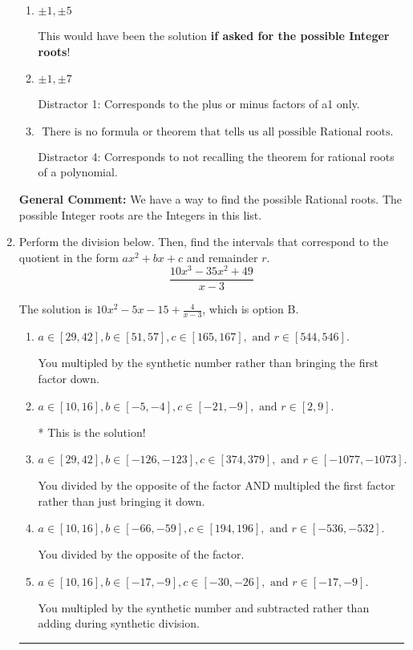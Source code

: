 \documentclass{extbook}[14pt]
\newcommand{\litem}[1]{\item #1

\rule{\textwidth}{0.4pt}}
\begin{document}
\begin{enumerate}
{\begin{enumerate}[label=\Alph*.]
 Distractor 3: Corresponds to the plus or minus of the inverse quotient (an/a0) of the factors. 
\item \( \pm 1,\pm 5 \)

This would have been the solution \textbf{if asked for the possible Integer roots}!
\item \( \pm 1,\pm 7 \)

 Distractor 1: Corresponds to the plus or minus factors of a1 only.
\item \( \text{ There is no formula or theorem that tells us all possible Rational roots.} \)

 Distractor 4: Corresponds to not recalling the theorem for rational roots of a polynomial.
\end{enumerate}

\textbf{General Comment:} We have a way to find the possible Rational roots. The possible Integer roots are the Integers in this list.
}
\litem{
Perform the division below. Then, find the intervals that correspond to the quotient in the form $ax^2+bx+c$ and remainder $r$.
\[ \frac{10x^{3} -35 x^{2} + 49}{x -3} \]

The solution is \( 10x^{2} -5 x -15 + \frac{4}{x -3} \), which is option B.\begin{enumerate}[label=\Alph*.]
\item \( a \in [29, 42], b \in [51, 57], c \in [165, 167], \text{ and } r \in [544, 546]. \)

 You multipled by the synthetic number rather than bringing the first factor down.
\item \( a \in [10, 16], b \in [-5, -4], c \in [-21, -9], \text{ and } r \in [2, 9]. \)

* This is the solution!
\item \( a \in [29, 42], b \in [-126, -123], c \in [374, 379], \text{ and } r \in [-1077, -1073]. \)

 You divided by the opposite of the factor AND multipled the first factor rather than just bringing it down.
\item \( a \in [10, 16], b \in [-66, -59], c \in [194, 196], \text{ and } r \in [-536, -532]. \)

 You divided by the opposite of the factor.
\item \( a \in [10, 16], b \in [-17, -9], c \in [-30, -26], \text{ and } r \in [-17, -9]. \)

 You multipled by the synthetic number and subtracted rather than adding during synthetic division.
\end{enumerate}

}
\end{enumerate}
\end{document}
